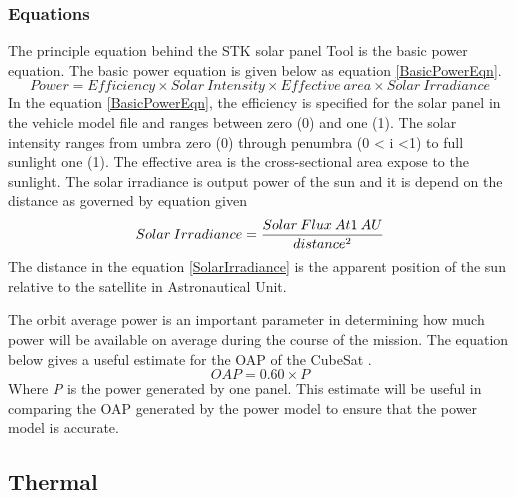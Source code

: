 \subsubsection{Equations}
The principle equation behind the STK solar panel Tool is the basic power equation\cite{STK_SPT}. The basic power equation is given below as equation \ref{BasicPowerEqn}.
\begin{equation}
Power = Efficiency \times Solar \:Intensity \times Effective \:area \times Solar \:Irradiance
\label{BasicPowerEqn}
\end{equation}
In the equation \ref{BasicPowerEqn}, the efficiency is specified for the solar panel in the vehicle model file and ranges between zero (0) and one (1). The solar intensity ranges from umbra zero (0) through penumbra (0 < i <1) to full sunlight one (1). The effective area is the cross-sectional area expose to the sunlight. The solar irradiance is output power of the sun and it is depend on the distance as governed by equation given
\begin{equation}
Solar \:Irradiance = \frac{Solar \:Flux \:At 1 \:AU}{distance\textsuperscript{2}}
\label{SolarIrradiance}
\end{equation}
The distance in the equation \ref{SolarIrradiance} is the apparent position of the sun relative to the satellite in Astronautical Unit\cite{STK_SPT}.

The orbit average power is an important parameter in determining how much power will be available on average during the course of the mission. The equation below gives a useful estimate for the OAP of the CubeSat \cite{budget}. 
\begin{equation}
OAP = 0.60 \times P
\end{equation}
Where \textit{P} is the power generated by one panel. This estimate will be useful in comparing the OAP generated by the power model to ensure that the power model is accurate. 

\subsection{Thermal}

